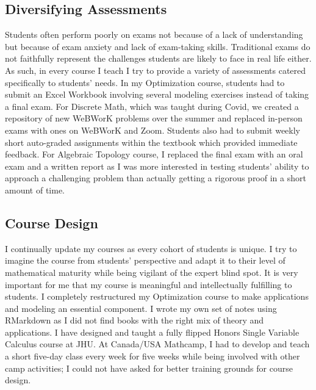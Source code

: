 \documentclass[10pt]{amsbook}
\begin{document}
  \subsection*{Diversifying Assessments}
  Students often perform poorly on exams not because of a lack of understanding but because of exam anxiety and lack of exam-taking skills. 
  Traditional exams do not faithfully represent the challenges students are likely to face in real life either.
  As such, in every course I teach I try to provide a variety of assessments catered specifically to students' needs. In my Optimization course, students had to submit an Excel Workbook involving several modeling exercises instead of taking a final exam. For Discrete Math, which was taught during Covid, we created a repository of new WeBWorK problems over the summer and replaced in-person exams with ones on WeBWorK and Zoom. Students also had to submit weekly short auto-graded assignments within the textbook which provided immediate feedback. For Algebraic Topology course, I replaced the final exam with an oral exam and a written report as I was more interested in testing students' ability to approach a challenging problem than actually getting a rigorous proof in a short amount of time.
  
  \subsection*{Course Design}
  I continually update my courses as every cohort of students is unique. 
  I try to imagine the course from students' perspective and adapt it to their level of mathematical maturity while being vigilant of the expert blind spot.
  It is very important for me that my course is meaningful and intellectually fulfilling to students.
  I completely restructured my Optimization course to make applications and modeling an essential component. 
  I wrote my own set of notes using RMarkdown as I did not find books with the right mix of theory and applications. 
  I have designed and taught a fully flipped Honors Single Variable Calculus course at JHU. 
  At Canada/USA Mathcamp, I had to develop and teach a short five-day class every week for five weeks while being involved with other camp activities;
  I could not have asked for better training grounds for course design.  
\end{document}
